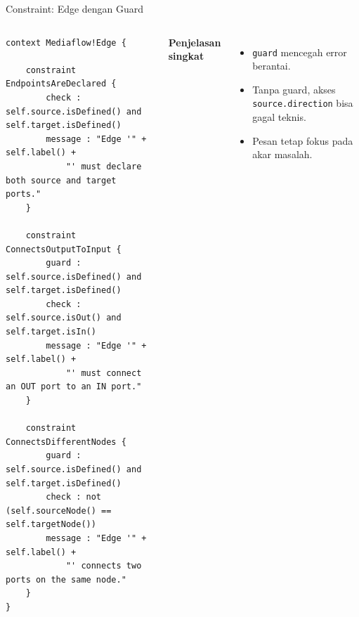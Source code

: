 \documentclass[aspectratio=169, table]{beamer}
\begin{document}
\begin{frame}[fragile]{Constraint: Edge dengan Guard}
\vspace{8pt}
\begin{columns}[T,onlytextwidth]
\begin{lstlisting}[language=eol, basicstyle=\ttfamily\tiny]
context Mediaflow!Edge {

    constraint EndpointsAreDeclared {
        check : self.source.isDefined() and self.target.isDefined()
        message : "Edge '" + self.label() +
            "' must declare both source and target ports."
    }

    constraint ConnectsOutputToInput {
        guard : self.source.isDefined() and self.target.isDefined()
        check : self.source.isOut() and self.target.isIn()
        message : "Edge '" + self.label() +
            "' must connect an OUT port to an IN port."
    }

    constraint ConnectsDifferentNodes {
        guard : self.source.isDefined() and self.target.isDefined()
        check : not (self.sourceNode() == self.targetNode())
        message : "Edge '" + self.label() +
            "' connects two ports on the same node."
    }
}
\end{lstlisting}

\scriptsize
\textbf{Penjelasan singkat}
\begin{itemize}
  \item \texttt{guard} mencegah error berantai.
  \item Tanpa guard, akses \texttt{source.direction} bisa gagal teknis.
  \item Pesan tetap fokus pada akar masalah.
\end{itemize}
\end{columns}
\end{frame}
\end{document}
